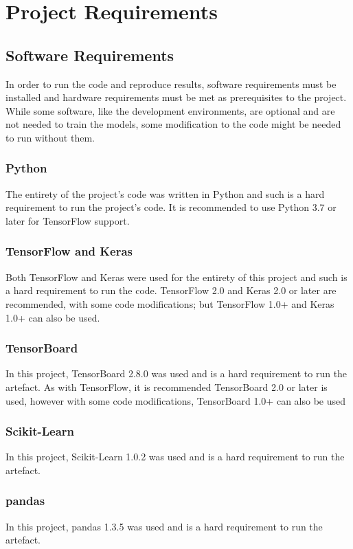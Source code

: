 \section{Project Requirements} \label{project-requirements}
\subsection{Software Requirements}
In order to run the code and reproduce results, software requirements must be installed and hardware requirements must be met as prerequisites to the project. While some software, like the development environments, are optional and are not needed to train the models, some modification to the code might be needed to run without them.

\subsubsection{Python}
The entirety of the project's code was written in Python and such is a hard requirement to run the project's code. It is recommended to use Python 3.7 or later for TensorFlow support.

\subsubsection{TensorFlow and Keras}
Both TensorFlow and Keras were used for the entirety of this project and such is a hard requirement to run the code. TensorFlow 2.0 and Keras 2.0 or later are recommended, with some code modifications; but TensorFlow 1.0+ and Keras 1.0+ can also be used.

\subsubsection{TensorBoard}
In this project, TensorBoard 2.8.0 was used and is a hard requirement to run the artefact. As with TensorFlow, it is recommended TensorBoard 2.0 or later is used, however with some code modifications, TensorBoard 1.0+ can also be used

\subsubsection{Scikit-Learn}
In this project, Scikit-Learn 1.0.2 was used and is a hard requirement to run the artefact.

\subsubsection{pandas}
In this project, pandas 1.3.5 was used and is a hard requirement to run the artefact.

